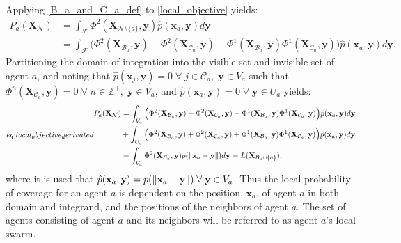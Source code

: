 Applying \eqref{B_a_and_C_a_def} to \eqref{local_objective} yields:
\begin{equation}
  \begin{split}
    P_{a}(\mathbf{X}_{\mathcal{N}}) &= \int_{\mathcal{F}}\Phi^{2}(\mathbf{X}_{\mathcal{N}\setminus\{a\}}, \mathbf{y})\hat{p}(\mathbf{x}_{a}, \mathbf{y})d\mathbf{y}\\
    &= \int_{\mathcal{F}}\Big(\Phi^{2}(\mathbf{X}_{\mathcal{B}_{a}}, \mathbf{y}) + \Phi^{2}(\mathbf{X}_{\mathcal{C}_{a}}, \mathbf{y}) + \Phi^{1}(\mathbf{X}_{\mathcal{B}_{a}}, \mathbf{y})\Phi^{1}(\mathbf{X}_{\mathcal{C}_{a}}, \mathbf{y})\Big)\hat{p}(\mathbf{x}_{a}, \mathbf{y})d\mathbf{y}.
  \end{split}
\end{equation}
Partitioning the domain of integration into the visible set and invisible set of agent $a$, and noting that $\hat{p}(\mathbf{x}_{j}, \mathbf{y}) = 0\;\forall\;j\in\mathcal{C}_{a},\;\mathbf{y}\in V_{a}$ such that
$\Phi^{n}(\mathbf{X}_{\mathcal{C}_{a}}, \mathbf{y}) = 0\;\forall\;n\in\mathbb{Z}^{+},\;\mathbf{y}\in V_{a}$, and $\hat{p}(\mathbf{x}_{a}, \mathbf{y}) = 0\;\forall\;\mathbf{y}\in U_{a}$ yields:
\begin{equation}\label[eq]{local_objective_derivated}
  \begin{split}
    P_{a}(\mathbf{X}_{\mathcal{N}}) &= \int_{V_{a}}\Big(\Phi^{2}(\mathbf{X}_{\mathcal{B}_{a}}, \mathbf{y}) + \Phi^{2}(\mathbf{X}_{\mathcal{C}_{a}}, \mathbf{y}) + \Phi^{1}(\mathbf{X}_{\mathcal{B}_{a}}, \mathbf{y})\Phi^{1}(\mathbf{X}_{\mathcal{C}_{a}}, \mathbf{y})\Big)\hat{p}(\mathbf{x}_{a}, \mathbf{y})d\mathbf{y}\\
    &+ \int_{U_{a}}\Big(\Phi^{2}(\mathbf{X}_{\mathcal{B}_{a}}, \mathbf{y}) + \Phi^{2}(\mathbf{X}_{\mathcal{C}_{a}}, \mathbf{y}) + \Phi^{1}(\mathbf{X}_{\mathcal{B}_{a}}, \mathbf{y})\Phi^{1}(\mathbf{X}_{\mathcal{C}_{a}}, \mathbf{y})\Big)\hat{p}(\mathbf{x}_{a}, \mathbf{y})d\mathbf{y}\\
    &= \int_{V_{a}}\Phi^{2}(\mathbf{X}_{\mathcal{B}_{a}}, \mathbf{y})p(\norm{\mathbf{x}_{a}-\mathbf{y}})d\mathbf{y} = L(\mathbf{X}_{\mathcal{B}_{a}\cup\{a\}}),
  \end{split}
\end{equation}
where it is used that $\hat{p}(\mathbf{x}_{a}, \mathbf{y}) = p(\left\lVert\mathbf{x}_{a}-\mathbf{y}\right\rVert)\;\forall\;\mathbf{y}\in V_{a}$. Thus the local probability of coverage for an agent $a$ is dependent on the position, $\mathbf{x}_{a}$, of agent $a$ in both domain and integrand, and the positions of the neighbors of agent $a$.
The set of agents consisting of agent $a$ and its neighbors will be referred to as agent $a$'s local swarm.\clearpage

